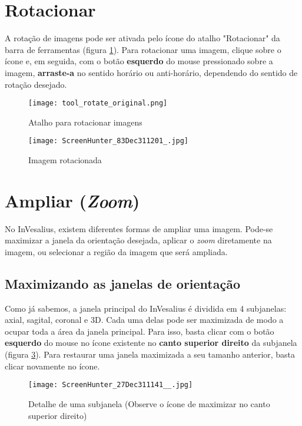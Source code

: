 \section{Rotacionar}

A rotação de imagens pode ser ativada pelo ícone do atalho "Rotacionar" da barra de ferramentas (figura
\ref{fig:rot_icon}). Para rotacionar uma imagem, clique sobre o ícone e, em seguida, com o botão
\textbf{esquerdo} do mouse pressionado sobre a imagem, \textbf{arraste-a} no sentido horário ou
anti-horário, dependendo do sentido de rotação desejado.

\begin{figure}[!htb]
\centering
\texttt{[image: tool\_rotate\_original.png]}
\caption{Atalho para rotacionar imagens}
\label{fig:rot_icon}
\end{figure}

\begin{figure}[!htb]
\centering
\texttt{[image: ScreenHunter\_83Dec311201\_.jpg]}
\caption{Imagem rotacionada}
\label{fig:rotate_all}
\end{figure}

\section{Ampliar (\textit{Zoom})}

No InVesalius, existem diferentes formas de ampliar uma imagem. Pode-se maximizar a janela da
orientação desejada, aplicar o \textit{zoom} diretamente na imagem, ou selecionar a região da imagem
que será ampliada.


\subsection{Maximizando as janelas de orientação}

Como já sabemos, a janela principal do InVesalius é dividida em 4 subjanelas: axial, sagital, coronal
e 3D. Cada uma delas pode ser maximizada de modo a ocupar toda a área da janela principal. Para isso,
basta clicar com o botão \textbf{esquerdo} do mouse no ícone existente no \textbf{canto superior direito}
da subjanela (figura \ref{fig:maximize_window}). Para restaurar uma janela maximizada a seu tamanho
anterior, basta clicar novamente no ícone.

\begin{figure}[!htb]
\centering
\texttt{[image: ScreenHunter\_27Dec311141\_\_.jpg]}
\caption{Detalhe de uma subjanela (Observe o ícone de maximizar no canto superior direito)}
\label{fig:maximize_window}
\end{figure}


